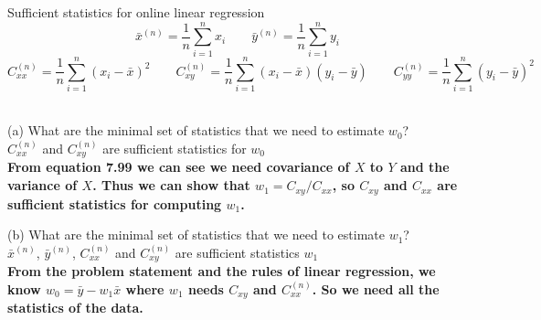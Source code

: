 \documentclass[draft]{exam} %
\theoremstyle{definition} \newtheorem*{defn}{Definition}
\begin{document}
\begin{questions}
 Sufficient statistics for online linear regression \\
$$\bar{x}^{(n)} = \frac{1}{n} \sum_{i=1}^{n} x_i \qquad \bar{y}^{(n)} = \frac{1}{n} \sum_{i=1}^{n} y_i$$
$$C_{xx}^{(n)} = \frac{1}{n} \sum_{i=1}^{n} (x_i - \bar{x})^2 \qquad C_{xy}^{(n)} = \frac{1}{n} \sum_{i=1}^{n} (x_i-\bar{x})(y_i - \bar{y}) \qquad C_{yy}^{(n)} = \frac{1}{n} \sum_{i=1}^{n}(y_i - \bar{y})^2$$

\begin{solution}  \\%
(a) What are the minimal set of statistics that we need to estimate $w_0$?\\
$C_{xx}^(n)$ and $C_{xy}^{(n)}$ are sufficient statistics for $w_0$\\
\textbf{From equation 7.99 we can see we need covariance of $X$ to $Y$ and the
variance of $X$. Thus we can show that $w_1=C_{xy}/C_{xx}$, so
$C_{xy}$ and $C_{xx}$ are sufficient statistics for computing $w_1$.}

(b) What are the minimal set of statistics that we need to estimate $w_1$?\\
$\bar{x}^{(n)}$, $\bar{y}^{(n)}$, $C_{xx}^(n)$ and $C_{xy}^{(n)}$ are sufficient statistics $w_1$\\
\textbf{From the problem statement and the rules of linear regression, we know
$w_0 = \bar{y}-w_1\bar{x}$ where $w_1$ needs 
$C_{xy}$ and $C_{xx}^{(n)}$. So we need all the statistics of the data.}


\end{solution}
\end{questions}
\end{document}
